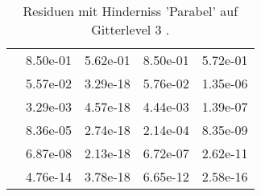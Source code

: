 \begin{table}
\begin{tabular}{c|cc|cc|}
\multicolumn{1}{|c|}{} & \multicolumn{1}{|c|}{  8.50e-01} & \multicolumn{1}{|c|}{  5.62e-01} & \multicolumn{1}{|c|}{  8.50e-01} & \multicolumn{1}{|c|}{  5.72e-01} \\ 
\multicolumn{1}{|c|}{} & \multicolumn{1}{|c|}{  5.57e-02} & \multicolumn{1}{|c|}{  3.29e-18} & \multicolumn{1}{|c|}{  5.76e-02} & \multicolumn{1}{|c|}{  1.35e-06} \\ 
\multicolumn{1}{|c|}{} & \multicolumn{1}{|c|}{  3.29e-03} & \multicolumn{1}{|c|}{  4.57e-18} & \multicolumn{1}{|c|}{  4.44e-03} & \multicolumn{1}{|c|}{  1.39e-07} \\ 
\multicolumn{1}{|c|}{} & \multicolumn{1}{|c|}{  8.36e-05} & \multicolumn{1}{|c|}{  2.74e-18} & \multicolumn{1}{|c|}{  2.14e-04} & \multicolumn{1}{|c|}{  8.35e-09} \\ 
\multicolumn{1}{|c|}{} & \multicolumn{1}{|c|}{  6.87e-08} & \multicolumn{1}{|c|}{  2.13e-18} & \multicolumn{1}{|c|}{  6.72e-07} & \multicolumn{1}{|c|}{  2.62e-11} \\ 
\multicolumn{1}{|c|}{} & \multicolumn{1}{|c|}{  4.76e-14} & \multicolumn{1}{|c|}{  3.78e-18} & \multicolumn{1}{|c|}{  6.65e-12} & \multicolumn{1}{|c|}{  2.58e-16} \\ 
\hline 
\end{tabular}\caption{Residuen mit Hinderniss 'Parabel' auf Gitterlevel 3 .}\label{tab:Residuum_Parabel_level3}
\end{table} 

